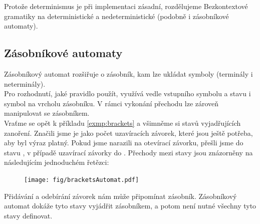 Protože determinismus je při implementaci zásadní, rozdělujeme Bezkontextové gramatiky
na deterministické a nedeterministické (podobně i zásobníkové automaty).\\


\subsection{Zásobníkové automaty}

Zásobníkový automat rozšiřuje  o zásobník, kam lze
ukládat symboly (terminály i neterminály).\\

Pro rozhodnutí, jaké pravidlo použít,
využívá vedle vstupního symbolu a stavu i symbol na vrcholu zásobníku. V rámci vykonání
přechodu lze zároveň manipulovat se zásobníkem.\\

Vraťme se opět k příkladu \ref{exmp:brackets} a všimněme si stavů
vyjadřujících zanoření. Značili jsme je jako počet uzavíracích závorek,
které jsou ještě potřeba, aby byl výraz platný. Pokud jsme narazili na
otevírací závorku, přešli jsme do stavu , v případě uzavírací závorky
do . Přechody mezi stavy jsou znázorněny na
následujícím jednoduchém řetězci:

\begin{figure}[H]
  \centering
  \texttt{[image: fig/bracketsAutomat.pdf]}
\end{figure}

Přidávání a odebírání závorek nám může připomínat zásobník.
Zásobníkový automat dokáže tyto stavy vyjádřit zásobníkem, a potom
není nutné všechny tyto stavy definovat.\\

